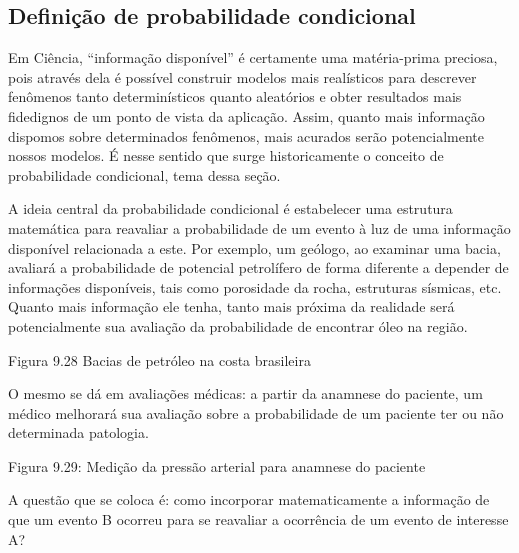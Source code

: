 \subsection{Definição de probabilidade condicional}
\label{\detokenize{PE511-7:sub-coloque-aqui-o-nome}}\label{\detokenize{PE511-7:definicao-de-probabilidade-condicional}}
Em Ciência,  “informação disponível”  é certamente uma matéria-prima preciosa, pois através dela é possível construir modelos mais realísticos para descrever  fenômenos tanto determinísticos quanto aleatórios e obter resultados mais fidedignos de um ponto de vista da aplicação. Assim, quanto mais informação dispomos sobre determinados fenômenos, mais acurados serão potencialmente nossos modelos. É nesse sentido que surge historicamente o conceito de probabilidade condicional, tema dessa seção.

A ideia central da probabilidade condicional é estabelecer uma estrutura matemática para reavaliar a probabilidade de um evento à luz de uma informação disponível relacionada a este. Por exemplo, um geólogo, ao examinar uma bacia, avaliará a probabilidade de potencial petrolífero de forma diferente a depender de informações disponíveis, tais como porosidade da rocha, estruturas sísmicas, etc. Quanto mais informação ele tenha, tanto mais próxima da realidade será potencialmente sua avaliação da probabilidade de encontrar óleo na região.
\label{\detokenize{PE511-7:fig-coloque-aqui-o-nome}}
\begin{figure}[H]
\centering

\noindent{}
\label{\detokenize{PE511-7:fig-coloque-aqui-o-nome}}\end{figure}

Figura 9.28 Bacias de petróleo na costa brasileira

O mesmo se dá em avaliações médicas: a partir da anamnese do paciente, um médico melhorará sua avaliação sobre a probabilidade de um paciente ter ou não determinada patologia.
\label{\detokenize{PE511-7:id1}}
\begin{figure}[H]
\centering

\noindent{}
\label{\detokenize{PE511-7:id1}}\end{figure}

Figura 9.29: Medição da pressão arterial para anamnese do paciente

A questão que se coloca é: como incorporar matematicamente a informação de que um evento B ocorreu para se reavaliar a ocorrência de um evento de interesse A?

